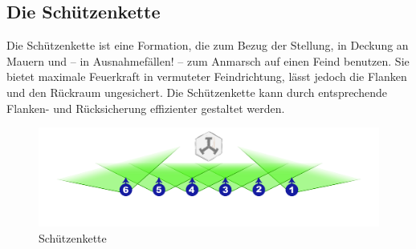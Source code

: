 \subsection{Die Schützenkette}
Die Schützenkette ist eine Formation, die zum Bezug der Stellung, in Deckung an Mauern und -- in Ausnahmefällen! -- zum Anmarsch auf einen Feind benutzen. Sie bietet maximale Feuerkraft in vermuteter Feindrichtung, lässt jedoch die Flanken und den Rückraum ungesichert. Die Schützenkette kann  durch entsprechende Flanken- und Rücksicherung effizienter gestaltet werden.\\
\begin{figure}[htbp]
	\centering
	\includegraphics[width=0.95\linewidth]{./img/grundlagen/formationen/kette_6mann.jpg}
		\caption{Schützenkette}
\end{figure}